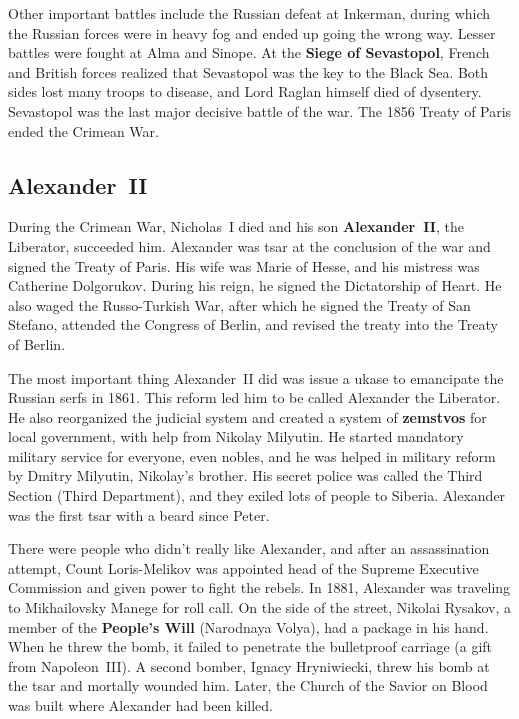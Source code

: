 Other important battles include the Russian defeat at Inkerman,
during which the Russian forces were in heavy fog and ended up going the wrong way.
Lesser battles were fought at Alma and Sinope.
At the \textbf{Siege of Sevastopol}, French and British forces realized that Sevastopol was the key to the Black Sea.
Both sides lost many troops to disease, and Lord Raglan himself died of dysentery.
Sevastopol was the last major decisive battle of the war.
The 1856 Treaty of Paris ended the Crimean War.

\subsection*{Alexander~II}

During the Crimean War, Nicholas~I died and his son \textbf{Alexander~II}, the Liberator, succeeded him.
Alexander was tsar at the conclusion of the war and signed the Treaty of Paris.
His wife was Marie of Hesse, and his mistress was Catherine Dolgorukov.
During his reign, he signed the Dictatorship of Heart.
He also waged the Russo-Turkish War, after which he signed the Treaty of San Stefano,
attended the Congress of Berlin, and revised the treaty into the Treaty of Berlin.

The most important thing Alexander~II did was issue a ukase to emancipate the Russian serfs in 1861.
This reform led him to be called Alexander the Liberator.
He also reorganized the judicial system and created a system of \textbf{zemstvos} for local government,
with help from Nikolay Milyutin.
He started mandatory military service for everyone, even nobles,
and he was helped in military reform by Dmitry Milyutin, Nikolay's brother.
His secret police was called the Third Section (Third Department), and they exiled lots of people to Siberia.
Alexander was the first tsar with a beard since Peter.

There were people who didn't really like Alexander, and after an assassination attempt,
Count Loris-Melikov was appointed head of the Supreme Executive Commission and given power to fight the rebels.
In 1881, Alexander was traveling to Mikhailovsky Manege for roll call.
On the side of the street, Nikolai Rysakov, a member of the \textbf{People's Will} (Narodnaya Volya),
had a package in his hand.
When he threw the bomb, it failed to penetrate the bulletproof carriage (a gift from Napoleon~III).
A second bomber, Ignacy Hryniwiecki, threw his bomb at the tsar and mortally wounded him.
Later, the Church of the Savior on Blood was built where Alexander had been killed.

